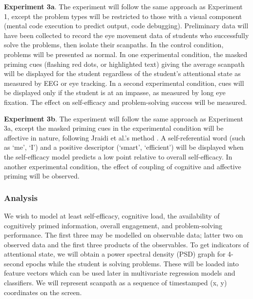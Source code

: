 \documentclass[hidelinks,11pt]{article}
\begin{document}
\textbf{Experiment 3a}. The experiment will follow the same approach as
Experiment 1, except the problem types will be restricted to those with a
visual component (mental code execution to predict output, code debugging).
Preliminary data will have been collected to record the eye movement data of
students who successfully solve the problems, then isolate their scanpaths.  In
the control condition, problems will be presented as normal.  In one
experimental condition, the masked priming cues (flashing red dots, or
highlighted text) giving the average scanpath will be displayed for the student
regardless of the student’s attentional state as measured by EEG or eye
tracking. In a second experimental condition, cues will be displayed only if
the student is at an impasse, as measured by long eye fixation.  The effect on
self-efficacy and problem-solving success will be measured.

\textbf{Experiment 3b}. The experiment will follow the same approach as
Experiment 3a, except the masked priming cues in the experimental condition
will be affective in nature, following Jraidi et al.’s method
{\citep{jraidi2011}}.  A self-referential word (such as ‘me’, ‘I’) and a positive
descriptor (‘smart’, ‘efficient’) will be displayed when the self-efficacy
model predicts a low point relative to overall self-efficacy.  In another
experimental condition, the effect of coupling of cognitive and affective
priming will be observed. 

\subsubsection{ Analysis }

We wish to model at least self-efficacy, cognitive load, the availability of
cognitively primed information, overall engagement, and problem-solving
performance. The first three may be modelled on observable data; latter two on
observed data and the first three products of the observables.  To get
indicators of attentional state, we will obtain a power spectral density (PSD)
graph for 4-second epochs while the student is solving problems.  These will be
loaded into feature vectors which can be used later in multivariate regression
models and classifiers.  We will represent scanpath as a sequence of
timestamped (x, y) coordinates on the screen.
\end{document}
